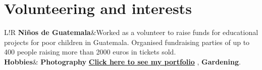 \documentclass[10pt]{article}
\newcommand\VRule{\color{lightgray}\vrule width 0.5pt}
\begin{document}
\section*{Volunteering and interests}
\vspace{-0.6pc}
\begin{tabular}{L!{\VRule}R}
{\bf Ni\~{n}os de Guatemala}&{Worked as a volunteer to raise funds for educational projects for poor children in Guatemala. Organised fundraising parties of up to 400 people raising more than 2000 euros in tickets sold.}\\
\vspace{-0.5pt}
{\bf Hobbies}&{\vspace{0.5pt} \textbf{Photography}  \href{https://500px.com/p/gaiagaudenzi9?view=photos}{\textbf{\textcolor{bluelink}{Click here to see my portfolio}}} }, \textbf{Gardening}.
\end{tabular}

\thispagestyle{empty} 
\end{document}
